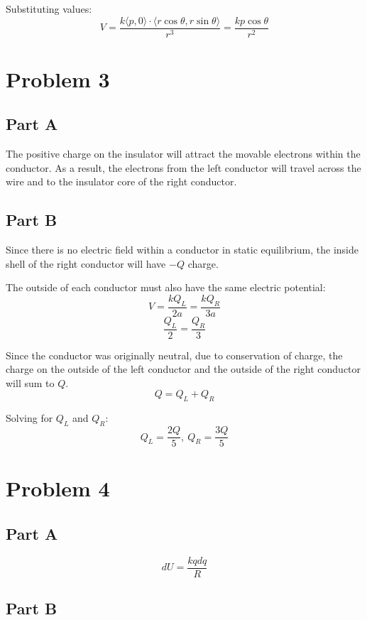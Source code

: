 \documentclass{article}
\begin{document}
Substituting values:
$$ V = \frac{ k \langle p, 0 \rangle \cdot \langle r \cos \theta, r \sin \theta
\rangle }{ r^{3} } = \frac{ k p \cos \theta }{ r^{2} }$$

\section*{Problem 3}

\subsection*{Part A}

The positive charge on the insulator will attract the movable electrons within
the conductor. As a result, the electrons from the left conductor will travel
across the wire and to the insulator core of the right conductor.

\subsection*{Part B}

Since there is no electric field within a conductor in static equilibrium, the
inside shell of the right conductor will have $-Q$ charge.

\bigbreak

The outside of each conductor must also have the same electric potential:
$$ V = \frac{ k Q_{L} }{ 2a } = \frac{ k Q_{R} }{ 3a } $$
$$ \frac{ Q_{L} }{ 2 } = \frac{ Q_{R} }{ 3 } $$

\bigbreak

Since the conductor was originally neutral, due to conservation of charge, the
charge on the outside of the left conductor and the outside of the right
conductor will sum to $Q$.
$$ Q = Q_{L} + Q_{R} $$

Solving for $Q_{L}$ and $Q_{R}$:
$$ Q_{L} = \frac{ 2 Q }{ 5 },\ Q_{R} = \frac{ 3 Q }{ 5 } $$

\section*{Problem 4}

\subsection*{Part A}

$$ dU = \frac{ k q dq }{ R } $$

\subsection*{Part B}
\end{document}
